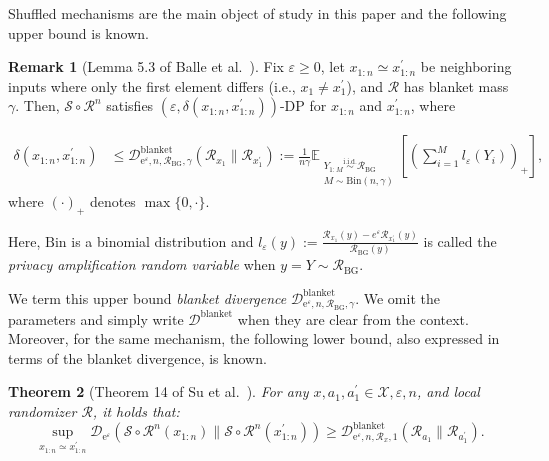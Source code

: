 \documentclass{article}
\theoremstyle{plain}
\newtheorem{theorem}{Theorem}[section]
\theoremstyle{definition}
\newtheorem{lemma}[theorem]{Remark}
\begin{document}
Shuffled mechanisms are the main object of study in this paper and the following upper bound is known.

\begin{lemma}[Lemma 5.3 of Balle et al.~\cite{ballePrivacyBlanketShuffle2019}]
\label{lem:upper-blanket-divergence}
Fix $\varepsilon \geq 0$, let $x_{1:n} \simeq x_{1:n}^\prime$ be neighboring inputs where only the first element differs (i.e., $x_1 \neq x^\prime_1$), and $\mathcal{R}$ has blanket mass $\gamma$. 
Then, $\mathcal{S} \circ \mathcal{R}^n$ satisfies $(\varepsilon,\delta(x_{1:n}, x_{1:n}^\prime))$-DP for $x_{1:n}$ and $x_{1:n}^\prime$, where


\begin{align}
\nonumber\delta(x_{1:n}, x_{1:n}^\prime)
&\le
\mathcal{D}_{\mathrm{e}^\varepsilon,n,\mathcal{R}_\mathrm{BG},\gamma}^{\mathrm{blanket}}
  (\mathcal{R}_{x_1} \| \mathcal{R}_{x_1^\prime})
:=\nonumber
\frac{1}{n\gamma}
\mathbb{E}_{\substack{
  Y_{1:M}\stackrel{\mathrm{i.i.d.}}{\sim} \mathcal{R}_\mathrm{BG} \\
  M\sim \mathrm{Bin}(n,\gamma)
}}
\left[ \left( \sum_{i=1}^M l_\varepsilon(Y_i)\right)_+ \right],
\end{align}
where $(\cdot)_+$ denotes $\max\{0,\cdot\}$.


Here, $\mathrm{Bin}$ is a binomial distribution and $l_\varepsilon(y) := \frac{\mathcal{R}_{x_1}(y) - e^{\varepsilon} \mathcal{R}_{x_1^\prime}(y)}{\mathcal{R}_\mathrm{BG}(y)}$
is called the \textit{privacy amplification random variable} when $y=Y\sim \mathcal{R}_\mathrm{BG}$.
\end{lemma}

We term this upper bound \textit{blanket divergence} $\mathcal{D}_{\mathrm{e}^\varepsilon, n,\mathcal{R}_\text{BG},\gamma}^{\text{blanket}}$.
We omit the parameters and simply write $\mathcal{D}^{\text{blanket}}$ when they are clear from the context.
Moreover, for the same mechanism, the following lower bound, also expressed in terms of the blanket divergence, is known.



\begin{theorem}[Theorem 14 of Su et al.~\cite{suDecompositionBasedOptimalBounds2025}]
\label{theorem:lower-blanket-divergence}
For any $x,a_1,a_1^\prime\in\mathcal{X},\varepsilon,n$, and local randomizer $\mathcal{R}$, it holds that:
$$
\sup_{x_{1:n} \simeq x_{1:n}^\prime}\mathcal{D}_{\mathrm{e}^\varepsilon}(\mathcal{S} \circ \mathcal{R}^n(x_{1:n}) \| \mathcal{S} \circ \mathcal{R}^n(x_{1:n}^\prime)) \geq \mathcal{D}_{\mathrm{e}^\varepsilon,n,\mathcal{R}_x,1}^{\text{blanket}}(\mathcal{R}_{a_1} \| \mathcal{R}_{a_1^\prime}).
$$
\end{theorem}
\end{document}
